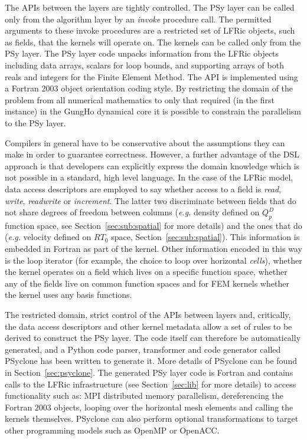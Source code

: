 \documentclass[review,times]{elsarticle}
\begin{document}
The APIs between the layers are tightly controlled. The PSy layer can
be called only from the algorithm layer by an {\em invoke} procedure
call. The permitted arguments to these invoke procedures are a restricted
set of LFRic objects, such as fields, that the kernels will operate on. The
kernels can be called only from the PSy layer. The PSy layer code
unpacks information from the LFRic objects including data
arrays, scalars for loop bounds, and supporting arrays of both reals
and integers for the Finite Element Method.
The API is implemented using a Fortran 2003 object
orientation coding style. By restricting the
domain of the problem from all numerical mathematics to only that
required (in the first instance) in the GungHo dynamical core it is
possible to constrain the parallelism to the PSy layer.

Compilers in general have to be conservative about the assumptions
they can make in order to guarantee correctness. However, a further
advantage of the DSL approach is that developers can
explicitly express the domain knowledge which is not possible in a
standard, high level language. In the case of the LFRic model, data
access descriptors are employed to say whether access to a field is
{\em read}, {\em write}, {\em readwrite} or {\em increment}. The latter 
two discriminate between fields that do not share degrees 
of freedom between columns ({\em e.g.} density defined on 
$Q_p^D$ function space, see Section~\ref{sec:sub:spatial} for more details) 
and the ones that do ({\em e.g.} velocity defined on $RT_0$ space, 
Section~\ref{sec:sub:spatial}). This information is embedded in
Fortran as part of the kernel. Other information encoded in this way
is the loop iterator (for example, the choice to loop over horizontal {\em cells}), whether the kernel
operates on a field which lives on a specific function space, whether
any of the fields live on common function spaces and for FEM kernels
whether the kernel uses any basis functions. 

The restricted domain, strict control of the APIs between layers and,
critically, the data access descriptors and other kernel metadata
allow a set of rules to be derived to construct the PSy layer. The
code itself can therefore be automatically generated, and a Python
code parser, transformer and code generator called PSyclone has been
written to generate it. More details of PSyclone can be found in
Section~\ref{sec:psyclone}. The generated PSy layer code is Fortran
and contains calls to the LFRic infrastructure (see
Section~\ref{sec:lib} for more details) to access functionality such
as: MPI distributed memory parallelism, dereferencing the Fortran 2003
objects, looping over the horizontal mesh elements and calling the
kernels themselves.  PSyclone can also perform optional
transformations to target other programming models such as OpenMP or
OpenACC.
\end{document}
